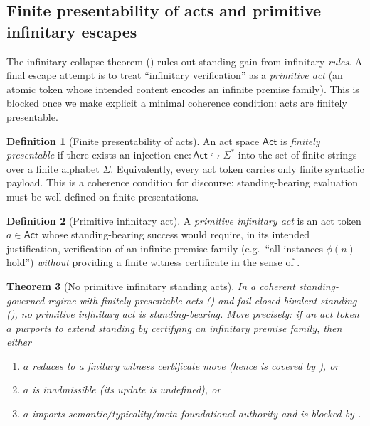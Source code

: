 \documentclass[11pt]{article}
\newtheorem{theorem}{Theorem}[section]
\theoremstyle{definition}
\newtheorem{definition}[theorem]{Definition}
\newcommand{\Act}{\mathsf{Act}}
\begin{document}
\subsection{Finite presentability of acts and primitive infinitary escapes}
\label{sec:finite-act}

The infinitary-collapse theorem () rules out standing gain from
infinitary \emph{rules}. A final escape attempt is to treat ``infinitary verification'' as a
\emph{primitive act} (an atomic token whose intended content encodes an infinite premise family).
This is blocked once we make explicit a minimal coherence condition: acts are finitely presentable.

\begin{definition}[Finite presentability of acts]
\label{def:finite-act-premise}
An act space $\Act$ is \emph{finitely presentable} if there exists an injection
$\mathrm{enc}:\Act\hookrightarrow \Sigma^*$ into the set of finite strings over a finite alphabet
$\Sigma$. Equivalently, every act token carries only finite syntactic payload.
This is a coherence condition for discourse: standing-bearing evaluation must be well-defined on
finite presentations.
\end{definition}

\begin{definition}[Primitive infinitary act]
\label{def:primitive-infinitary-act}
A \emph{primitive infinitary act} is an act token $a\in\Act$ whose standing-bearing success would
require, in its intended justification, verification of an infinite premise family
(e.g.\ ``all instances $\phi(n)$ hold'') \emph{without} providing a finite witness certificate in the
sense of .
\end{definition}

\begin{theorem}[No primitive infinitary standing acts]
\label{thm:no-primitive-infinitary-acts}
In a coherent standing-governed regime with finitely presentable acts
() and fail-closed bivalent standing
(), no primitive infinitary act is
standing-bearing.
More precisely: if an act token $a$ purports to extend standing by certifying an infinitary premise
family, then either
\begin{enumerate}[label=(\alph*), leftmargin=2.0em]
\item $a$ reduces to a finitary witness certificate move (hence is covered by
), or
\item $a$ is inadmissible (its update is undefined), or
\item $a$ imports semantic/typicality/meta-foundational authority and is blocked by
.
\end{enumerate}
\end{theorem}
\end{document}
